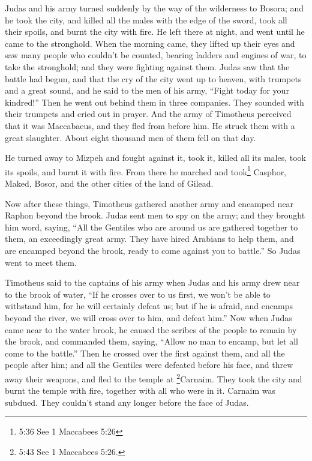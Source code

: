  Judas and his army turned suddenly by the way of the
wilderness to Bosora; and he took the city, and killed all the males
with the edge of the sword, took all their spoils, and burnt the city
with fire.  He left there at night, and went until he came
to the stronghold.  When the morning came, they lifted up
their eyes and saw many people who couldn't be counted, bearing ladders
and engines of war, to take the stronghold; and they were fighting
against them.  Judas saw that the battle had begun, and
that the cry of the city went up to heaven, with trumpets and a great
sound,  and he said to the men of his army, ``Fight today
for your kindred!''  Then he went out behind them in three
companies. They sounded with their trumpets and cried out in prayer.
 And the army of Timotheus perceived that it was
Maccabaeus, and they fled from before him. He struck them with a great
slaughter. About eight thousand men of them fell on that day.

 He turned away to Mizpeh and fought against it, took it,
killed all its males, took its spoils, and burnt it with fire.
 From there he marched and took\footnote{5:36 See 1
  Maccabees 5:26} Casphor, Maked, Bosor, and the other cities of the
land of Gilead.

 Now after these things, Timotheus gathered another army
and encamped near Raphon beyond the brook.  Judas sent men
to spy on the army; and they brought him word, saying, ``All the
Gentiles who are around us are gathered together to them, an exceedingly
great army.  They have hired Arabians to help them, and are
encamped beyond the brook, ready to come against you to battle.'' So
Judas went to meet them.

 Timotheus said to the captains of his army when Judas and
his army drew near to the brook of water, ``If he crosses over to us
first, we won't be able to withstand him, for he will certainly defeat
us;  but if he is afraid, and encamps beyond the river, we
will cross over to him, and defeat him.''  Now when Judas
came near to the water brook, he caused the scribes of the people to
remain by the brook, and commanded them, saying, ``Allow no man to
encamp, but let all come to the battle.''  Then he crossed
over the first against them, and all the people after him; and all the
Gentiles were defeated before his face, and threw away their weapons,
and fled to the temple at \footnote{5:43 See 1 Maccabees 5:26.}Carnaim.
 They took the city and burnt the temple with fire,
together with all who were in it. Carnaim was subdued. They couldn't
stand any longer before the face of Judas.

